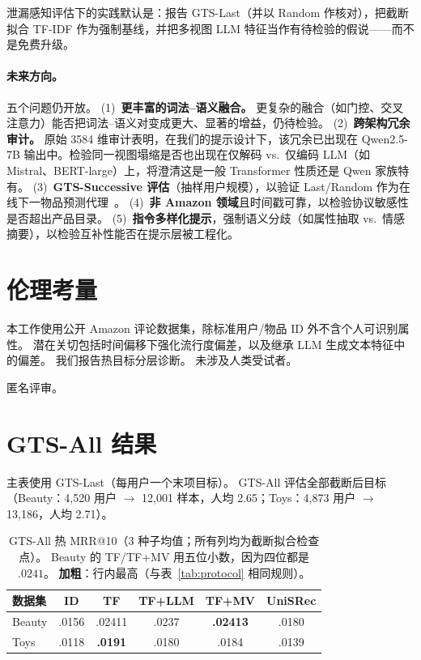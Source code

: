 \documentclass[sigconf,natbib=true,anonymous]{acmart}
\newcommand{\tfidf}{\textsc{TF-IDF}\xspace}
\newcommand{\tfmv}{\textsc{TF+MV}\xspace}
\begin{document}
泄漏感知评估下的实践默认是：报告 GTS-Last（并以 Random 作核对），把截断拟合 \tfidf 作为强制基线，并把多视图 LLM 特征当作有待检验的假说——而不是免费升级。

\paragraph{未来方向。}
五个问题仍开放。
(1)~\textbf{更丰富的词法--语义融合。} 更复杂的融合（如门控、交叉注意力）能否把词法--语义对变成更大、显著的增益，仍待检验。
(2)~\textbf{跨架构冗余审计。} 原始 3584 维审计表明，在我们的提示设计下，该冗余已出现在 Qwen2.5-7B 输出中。检验同一视图塌缩是否也出现在仅解码 vs.\ 仅编码 LLM（如 Mistral、BERT-large）上，将澄清这是一般 Transformer 性质还是 Qwen 家族特有。
(3)~\textbf{GTS-Successive 评估}（抽样用户规模），以验证 Last/Random 作为在线下一物品预测代理~\cite{gusak2025time}。
(4)~\textbf{非 Amazon 领域}且时间戳可靠，以检验协议敏感性是否超出产品目录。
(5)~\textbf{指令多样化提示}，强制语义分歧（如属性抽取 vs.\ 情感摘要），以检验互补性能否在提示层被工程化。

\section*{伦理考量}
本工作使用公开 Amazon 评论数据集，除标准用户/物品 ID 外不含个人可识别属性。
潜在关切包括时间偏移下强化流行度偏差，以及继承 LLM 生成文本特征中的偏差。
我们报告热目标分层诊断。
未涉及人类受试者。

\begin{acks}
匿名评审。
\end{acks}

\appendix
\renewcommand{\arraystretch}{0.88}
\setlength{\abovecaptionskip}{4pt}
\setlength{\belowcaptionskip}{2pt}

\section{GTS-All 结果}
\label{app:gts-all}

主表使用 GTS-Last（每用户一个末项目标）。
GTS-All 评估全部截断后目标（Beauty：4{,}520 用户 $\to$ 12{,}001 样本，人均 2.65；Toys：4{,}873 用户 $\to$ 13{,}186，人均 2.71）。

\begin{table}[H]
\centering
\caption{GTS-All 热 MRR@10（3 种子均值；所有列均为截断拟合检查点）。
Beauty 的 TF/\tfmv 用五位小数，因为四位都是 $.0241$。
\textbf{加粗}：行内最高（与表~\ref{tab:protocol} 相同规则）。}
\label{tab:gts-all}
\small
\begin{tabular}{@{}lccccc@{}}
\toprule
数据集 & ID & TF & TF+LLM & TF+MV & UniSRec \\
\midrule
Beauty & .0156 & .02411 & .0237 & \textbf{.02413} & .0180 \\
Toys   & .0118 & \textbf{.0191} & .0180 & .0184 & .0139 \\
\bottomrule
\end{tabular}
\end{table}
\end{document}
